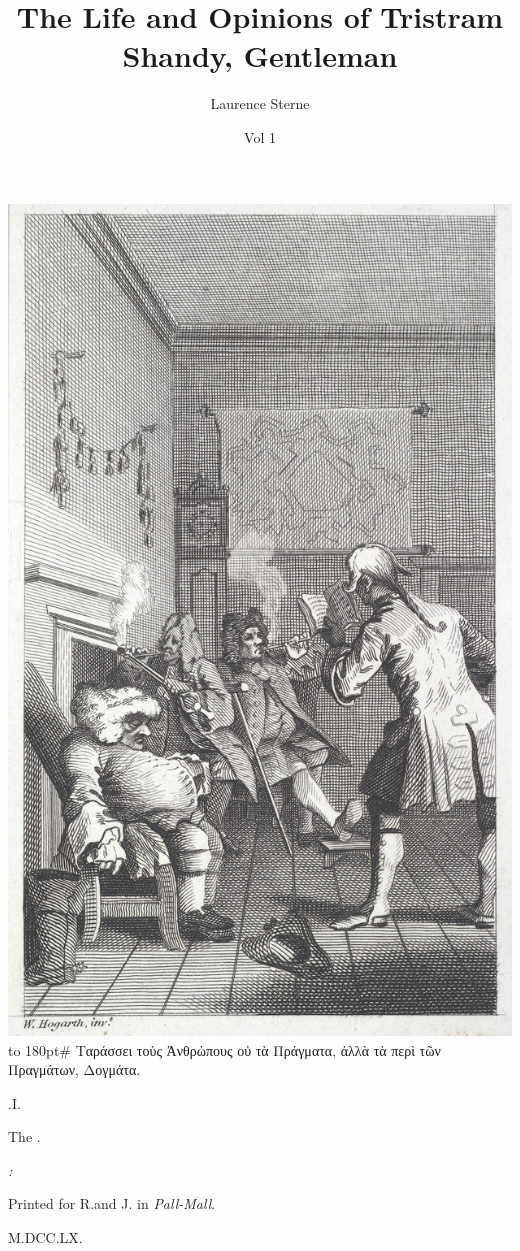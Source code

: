 \documentclass{article}
\title{The Life and Opinions of Tristram Shandy, Gentleman}
\author{Laurence Sterne}
\date{Vol 1}
\begin{document}
\pagestyle{empty}
\null\newpage\noindent
\includegraphics[width=\textwidth]{hogarth-front-1}
\newpage
\vbox{\openup 10pt}
\vfill
\vbox{\openup -2pt\halign to 180pt{\footnotesize #\cr
\quad Ταράσσει τοὺς Ἀνθρὠπους οὐ τὰ Πράγματα,\cr
ἀλλὰ τὰ περὶ τῶν Πραγμάτων, Δογμάτα.\hfill\cr}}
\vfill
\centerline{.\quad I.}
\smallskip
\centerline{The\kern 5pt .}
\vfill
\centerline{\itshape{}:}
\centerline{\smaller Printed for R.\@ and J.\@ {} in \textit{Pall-Mall}.}
\centerline{M.DCC.LX.}
\end{document}
